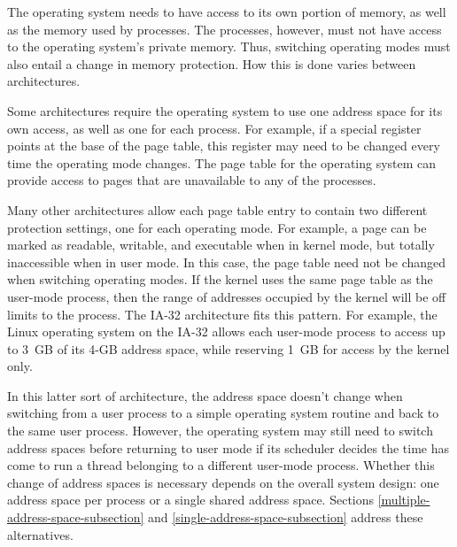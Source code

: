 The operating system needs to have access to its own portion of
memory, as well as the memory used by processes.  The processes,
however, must not have access to the operating system's private
memory.  Thus, switching
operating modes must also entail a change in memory protection.  How
this is done varies between architectures.

Some architectures require the operating system to use one address
space for its own access, as well as one for each process.  For
example, if a special register points at the base of the page table,
this register may need to be changed every time the operating mode
changes.  The page table for the operating system can provide access
to pages that are unavailable to any of the processes.

Many other architectures allow each page table entry to contain two
different protection settings, one for each operating mode.  For
example, a page can be marked as readable, writable, and executable
when in kernel mode, but totally inaccessible when in user mode.  In
this case, the page table need not be changed when switching operating
modes.  If the kernel uses the same page table as the user-mode
process, then the range of addresses occupied by the kernel will be
off limits to the process.  The IA-32 architecture fits this pattern.
For example, the Linux operating system on the IA-32 allows each
user-mode process to access up to 3~GB of its 4-GB address space,
while reserving 1~GB for access by the kernel only.

In this latter sort of architecture, the address space doesn't change
when switching from a user process to a simple operating system
routine and back to the same user process.  However, the operating
system may still need to switch address spaces before returning to
user mode if its scheduler decides the time has come to run a
thread belonging to a 
different user-mode process.  Whether this change of address spaces is
necessary depends on the overall system design: one address space per
process or a single shared address space.
Sections \ref{multiple-address-space-subsection} and \ref{single-address-space-subsection}
address these alternatives.


